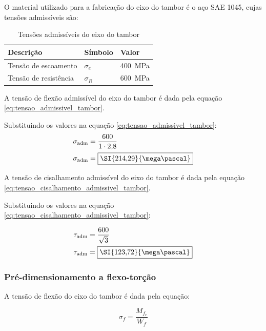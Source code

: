 O material utilizado para a fabricação do eixo do tambor é o aço SAE 1045, cujas tensões admissíveis são:

\begin{table}[H]
  \centering
  \caption{Tensões admissíveis do eixo do tambor}
  \label{tab:tensoes_eixo_do_tambor}
  \begin{tabularx}{\textwidth}{>{\centering\arraybackslash}X>{\centering\arraybackslash}X>{\centering\arraybackslash}X}
    \toprule
    Descrição             & Símbolo    & Valor                  \\
    \midrule
    Tensão de escoamento  & $\sigma_e$ & \SI{400}{\mega\pascal} \\
    Tensão de resistência & $\sigma_R$ & \SI{600}{\mega\pascal} \\
    \bottomrule
  \end{tabularx}
\end{table}

A tensão de flexão admissível do eixo do tambor é dada pela equação \eqref{eq:tensao_admissivel_tambor}.

Substituindo os valores na equação \eqref{eq:tensao_admissivel_tambor}:
\begin{align*}
  \sigma_{\text{adm}} & = \frac{600}{1 \cdot 2{,}8}           \\
  \sigma_{\text{adm}} & = \boxed{\SI{214{,}29}{\mega\pascal}}
\end{align*}

A tensão de cisalhamento admissível do eixo do tambor é dada pela equação \eqref{eq:tensao_cisalhamento_admissivel_tambor}.

Substituindo os valores na equação \eqref{eq:tensao_cisalhamento_admissivel_tambor}:

\begin{align*}
  \tau_{\text{adm}} & = \frac{600}{\sqrt{3}}                \\
  \tau_{\text{adm}} & = \boxed{\SI{123{,}72}{\mega\pascal}}
\end{align*}

\subsubsection{Pré-dimensionamento a flexo-torção}

A tensão de flexão do eixo do tambor é dada pela equação:

\begin{equation}
  \sigma_f = \frac{M_{f_e}}{W_f}
  \label{eq:tensao_flexao_eixo_do_tambor}
\end{equation}


